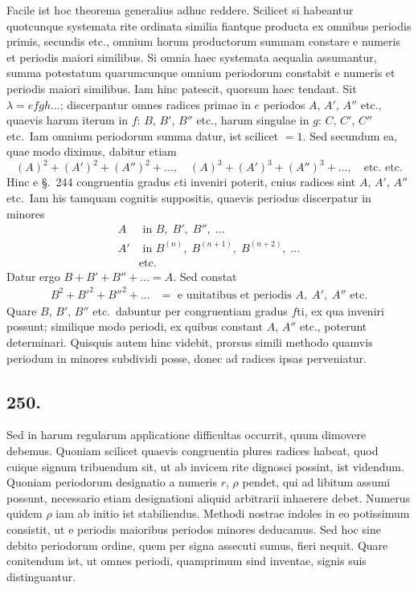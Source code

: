 \documentclass[12pt,a4paper]{article}
\newcommand{\Sec}{\S}
\begin{document}
Facile ist hoc theorema generalius adhuc reddere. Scilicet si habeantur quotcunque systemata rite ordinata similia fiantque producta ex omnibus periodis primis, secundis etc., omnium horum productorum summam constare e numeris et periodis maiori similibus. Si omnia haec systemata aequalia assumantur, summa potestatum quarumcunque omnium periodorum constabit e numeris et periodis maiori similibus. Iam hinc patescit, quorsum haec tendant. Sit $\lambda=efgh\ldots$; discerpantur omnes radices primae in $e$ periodos $A$, $A'$, $A''$ etc., quaevis harum iterum in $f$: $B$, $B'$, $B''$ etc., harum singulae in $g$: $C$, $C'$, $C''$ etc.~Iam omnium periodorum summa datur, ist scilicet $=1$. Sed secundum ea, quae modo diximus, dabitur etiam
\[
(A)^2+(A')^2+(A'')^2+\ldots,\quad (A)^3+(A')^3+(A'')^3+\ldots,\quad \text{etc.~etc.}
\]
Hinc e \Sec.~244 congruentia gradus $e$ti inveniri poterit, cuius radices sint $A$, $A'$, $A''$ etc.~Iam his tamquam cognitis suppositis, quaevis periodus discerpatur in minores
\[
\begin{aligned}
A &\text{ in } B,\; B',\; B'',\; \ldots\\
A' &\text{ in } B^{(n)},\; B^{(n+1)},\; B^{(n+2)},\; \ldots\\
& \text{etc.}
\end{aligned}
\]
Datur ergo $B+B'+B''+\ldots = A$. Sed constat
\[
\begin{aligned}
B^2+B'^2+B''^2+\ldots &= \text{ e unitatibus et periodis } A,\; A',\; A'' \text{ etc.}
\end{aligned}
\]
Quare $B$, $B'$, $B''$ etc.~dabuntur per congruentiam gradus $f$ti, ex qua inveniri possunt; similique modo periodi, ex quibus constant $A$, $A''$ etc., poterunt determinari. Quisquis autem hinc videbit, prorsus simili methodo quamvis periodum in minores subdividi posse, donec ad radices ipsas perveniatur.

\subsection*{250.}

Sed in harum regularum applicatione difficultas occurrit, quum dimovere debemus. Quoniam scilicet quaevis congruentia plures radices habeat, quod cuique signum tribuendum sit, ut ab invicem rite dignosci possint, ist videndum. Quoniam periodorum designatio a numeris $r$, $\rho$ pendet, qui ad libitum assumi possunt, necessario etiam designationi aliquid arbitrarii inhaerere debet. Numerus quidem $\rho$ iam ab initio ist stabiliendus. Methodi nostrae indoles in eo potissimum consistit, ut e periodis maioribus periodos minores deducamus. Sed hoc sine debito periodorum ordine, quem per signa assecuti sumus, fieri nequit. Quare conitendum ist, ut omnes periodi, quamprimum sind inventae, signis suis distinguantur.
\end{document}
